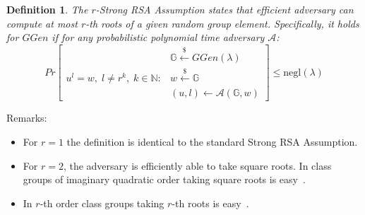 \documentclass[a4paper]{article}
\newtheorem{definition}{Definition}
\begin{document}
\begin{definition}
The \emph{$r$-Strong RSA Assumption} states that 
efficient adversary can  compute at most $r$-th roots of a given random group element. Specifically,
it holds for $GGen$ if for any probabilistic polynomial time adversary $\mathcal{A}$:
$$
Pr
\begin{bmatrix}
&\mathbb{G}\xleftarrow{\$}GGen(\lambda)\\
u^l = w,\; l\neq r^k,\;k\in\mathbb{N} :
& w\xleftarrow{\$}\mathbb{G}\\
&(u,l) \xleftarrow{} \mathcal{A}(\mathbb{G},w)
\end{bmatrix}\leq \mathrm{negl}(\lambda)
$$
\end{definition}
Remarks:
\begin{itemize}
    \item For $r = 1$ the definition is identical to the standard Strong RSA Assumption. 
    \item For $r = 2$, the adversary
is efficiently able to take square roots. In class groups of imaginary quadratic order taking
square roots is easy~\cite{cryptoeprint:2019:1229}.
    \item In $r$-th order class groups taking $r$-th roots is easy~\cite{cryptoeprint:2019:1229}.
    \end{itemize}
\end{document}
